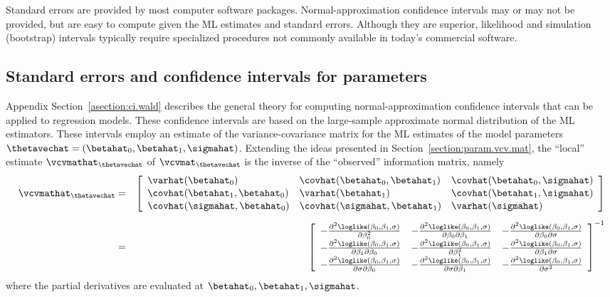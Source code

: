 Standard errors are provided by most computer software packages.
Normal-approximation confidence intervals may or may not be provided,
but are easy to compute given the ML estimates and standard errors.
Although they are superior, likelihood and simulation (bootstrap)
intervals typically require specialized procedures not commonly
available in today's commercial software.

\subsection{Standard errors and confidence intervals for parameters}
\label{section:se.and.ci.for.regr.param}
Appendix Section~\ref{asection:ci.wald} describes the general theory for
computing normal-approximation confidence intervals that can be
applied to regression models. These confidence intervals are based on
the large-sample approximate normal distribution of the ML estimators.
These intervals employ an estimate of the variance-covariance matrix
for the ML estimates of the model parameters
$\thetavechat=(\betahat_{0},\betahat_{1},\sigmahat)$. Extending the
ideas presented in Section~\ref{section:param.vcv.mat}, the ``local''
estimate $\vcvmathat_{\thetavechat}$ of $\vcvmat_{\thetavechat}$ is
the inverse of the ``observed'' information matrix, namely
\begin{eqnarray}
\label{equation:regr.local.est.vcv}
\vcvmathat_{\thetavechat} &=&
\left[ 
\begin{array}{lll}
\varhat(\betahat_{0})& \covhat(\betahat_{0},\betahat_{1})& 
	\covhat(\betahat_{0},\sigmahat)\\[.2ex]
\covhat(\betahat_{1},\betahat_{0}) & \varhat(\betahat_{1})&
	\covhat(\betahat_{1}, \sigmahat) \\[.2ex]
\covhat(\sigmahat,\betahat_{0})& 
	\covhat(\sigmahat,\betahat_{1})& \varhat(\sigmahat)
\end{array}
\right]\\[1ex]
&=&
\left[ 
\begin{array}{lll}
-\frac{\partial ^{2} \loglike(\beta_{0},\beta_{1},\sigma)}
	{\partial\beta_{0}^{2} }&
-\frac{\partial ^{2} \loglike(\beta_{0},\beta_{1},\sigma)}
	{\partial\beta_{0} \partial \beta_{1}}&
-\frac{\partial ^{2} \loglike(\beta_{0},\beta_{1},\sigma)}
	{\partial\beta_{0} \partial \sigma }\\[.2ex]
-\frac{\partial^{2} \loglike(\beta_{0},\beta_{1},\sigma)}
	{\partial \beta_{1} \partial \beta_{0}  }&
-\frac{\partial ^{2} \loglike(\beta_{0},\beta_{1},\sigma)}
	{\partial\beta^{2}_{1}  }&
-\frac{\partial ^{2} \loglike(\beta_{0},\beta_{1},\sigma)}
	{\partial\beta_{1} \partial \sigma }\\[.2ex]
-\frac{\partial ^{2} \loglike(\beta_{0},\beta_{1},\sigma)}
	{\partial \sigma \partial \beta_{0} }&
-\frac{\partial ^{2} \loglike(\beta_{0},\beta_{1},\sigma)}
	{\partial \sigma \partial \beta_{1} }&
-\frac{\partial ^{2} \loglike(\beta_{0},\beta_{1},\sigma)}
	{\partial \sigma^{2} }
\end{array}
\right]^{-1} \nonumber
\end{eqnarray}
where the partial derivatives are evaluated at
$\betahat_{0},\betahat_{1},\sigmahat$.

